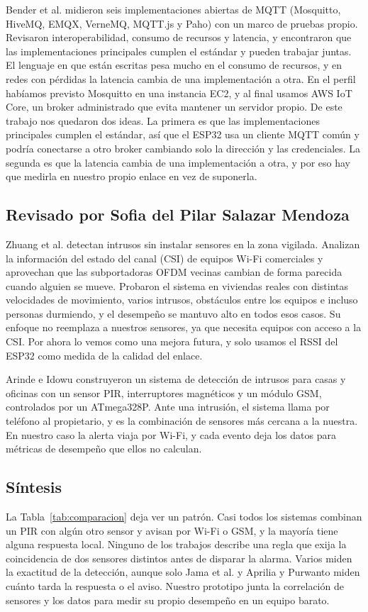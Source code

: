 \documentclass[manuscript,screen,nonacm]{acmart}
\begin{document}
Bender et al. \cite{bender2021mqtt} midieron seis implementaciones abiertas de MQTT (Mosquitto, HiveMQ, EMQX, VerneMQ, MQTT.js y Paho) con un marco de pruebas propio. Revisaron interoperabilidad, consumo de recursos y latencia, y encontraron que las implementaciones principales cumplen el estándar y pueden trabajar juntas. El lenguaje en que están escritas pesa mucho en el consumo de recursos, y en redes con pérdidas la latencia cambia de una implementación a otra. En el perfil habíamos previsto Mosquitto en una instancia EC2, y al final usamos AWS IoT Core, un broker administrado que evita mantener un servidor propio. De este trabajo nos quedaron dos ideas. La primera es que las implementaciones principales cumplen el estándar, así que el ESP32 usa un cliente MQTT común y podría conectarse a otro broker cambiando solo la dirección y las credenciales. La segunda es que la latencia cambia de una implementación a otra, y por eso hay que medirla en nuestro propio enlace en vez de suponerla.

\subsection{Revisado por Sofia del Pilar Salazar Mendoza}
Zhuang et al. \cite{zhuang2021intrusion} detectan intrusos sin instalar sensores en la zona vigilada. Analizan la información del estado del canal (CSI) de equipos Wi-Fi comerciales y aprovechan que las subportadoras OFDM vecinas cambian de forma parecida cuando alguien se mueve. Probaron el sistema en viviendas reales con distintas velocidades de movimiento, varios intrusos, obstáculos entre los equipos e incluso personas durmiendo, y el desempeño se mantuvo alto en todos esos casos. Su enfoque no reemplaza a nuestros sensores, ya que necesita equipos con acceso a la CSI. Por ahora lo vemos como una mejora futura, y solo usamos el RSSI del ESP32 como medida de la calidad del enlace.

Arinde e Idowu \cite{arinde2024multisensor} construyeron un sistema de detección de intrusos para casas y oficinas con un sensor PIR, interruptores magnéticos y un módulo GSM, controlados por un ATmega328P. Ante una intrusión, el sistema llama por teléfono al propietario, y es la combinación de sensores más cercana a la nuestra. En nuestro caso la alerta viaja por Wi-Fi, y cada evento deja los datos para métricas de desempeño que ellos no calculan.

\subsection{Síntesis}
La Tabla~\ref{tab:comparacion} deja ver un patrón. Casi todos los sistemas combinan un PIR con algún otro sensor y avisan por Wi-Fi o GSM, y la mayoría tiene alguna respuesta local. Ninguno de los trabajos describe una regla que exija la coincidencia de dos sensores distintos antes de disparar la alarma. Varios miden la exactitud de la detección, aunque solo Jama et al. \cite{jama2026edge} y Aprilia y Purwanto \cite{aprilia2025boarding} miden cuánto tarda la respuesta o el aviso. Nuestro prototipo junta la correlación de sensores y los datos para medir su propio desempeño en un equipo barato.
\end{document}
